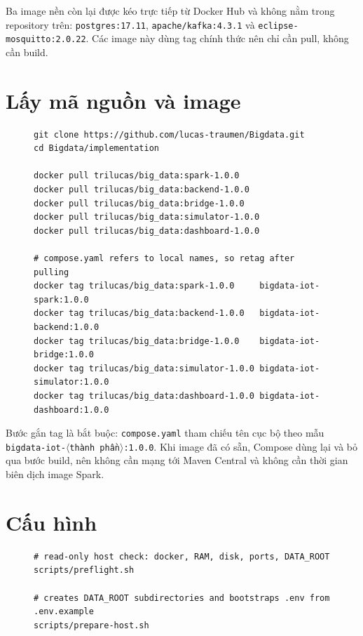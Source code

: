 Ba image nền còn lại được kéo trực tiếp từ Docker Hub và không nằm trong
repository trên: \texttt{postgres:17.11}, \texttt{apache/kafka:4.3.1} và
\texttt{eclipse-mosquitto:2.0.22}. Các image này dùng tag chính thức nên chỉ
cần pull, không cần build.

\section{Lấy mã nguồn và image}

\begin{figure}[H]
\label{lst:clone-pull}
\begin{lstlisting}[basicstyle=\ttfamily\footnotesize,frame=single]
git clone https://github.com/lucas-traumen/Bigdata.git
cd Bigdata/implementation

docker pull trilucas/big_data:spark-1.0.0
docker pull trilucas/big_data:backend-1.0.0
docker pull trilucas/big_data:bridge-1.0.0
docker pull trilucas/big_data:simulator-1.0.0
docker pull trilucas/big_data:dashboard-1.0.0

# compose.yaml refers to local names, so retag after pulling
docker tag trilucas/big_data:spark-1.0.0     bigdata-iot-spark:1.0.0
docker tag trilucas/big_data:backend-1.0.0   bigdata-iot-backend:1.0.0
docker tag trilucas/big_data:bridge-1.0.0    bigdata-iot-bridge:1.0.0
docker tag trilucas/big_data:simulator-1.0.0 bigdata-iot-simulator:1.0.0
docker tag trilucas/big_data:dashboard-1.0.0 bigdata-iot-dashboard:1.0.0
\end{lstlisting}
\end{figure}

Bước gắn tag là bắt buộc: \texttt{compose.yaml} tham chiếu tên cục bộ theo mẫu
\texttt{bigdata-iot-}$\langle$\texttt{thành phần}$\rangle$\texttt{:1.0.0}. Khi
image đã có sẵn, Compose dùng lại và bỏ qua bước build, nên không cần mạng tới
Maven Central và không cần thời gian biên dịch image Spark.

\section{Cấu hình}

\begin{figure}[H]
\label{lst:prepare}
\begin{lstlisting}[basicstyle=\ttfamily\footnotesize,frame=single]
# read-only host check: docker, RAM, disk, ports, DATA_ROOT
scripts/preflight.sh

# creates DATA_ROOT subdirectories and bootstraps .env from .env.example
scripts/prepare-host.sh
\end{lstlisting}
\end{figure}


